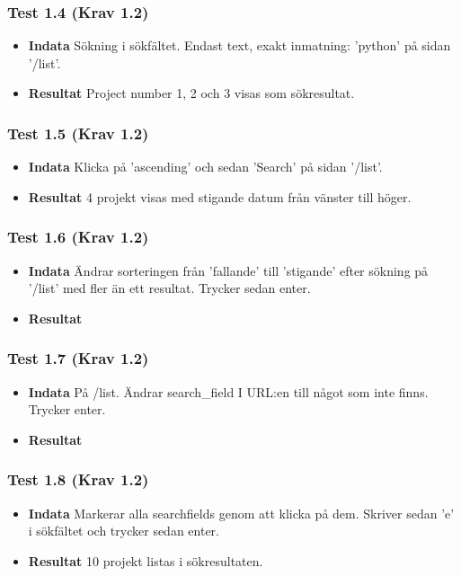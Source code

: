 \documentclass{TDP003mall}
\begin{document}
\subsubsection*{Test 1.4 (Krav 1.2)}
\begin{itemize}
\item[]\textbf{Indata} Sökning i sökfältet. Endast text, exakt inmatning: 'python' på sidan '/list'.
\item[]\textbf{Resultat} Project number 1, 2 och 3 visas som sökresultat.
\end{itemize}
\subsubsection*{Test 1.5 (Krav 1.2)}
\begin{itemize}
\item[]\textbf{Indata} Klicka på 'ascending' och sedan 'Search' på sidan '/list'.
\item[]\textbf{Resultat} 4 projekt visas med stigande datum från vänster till höger.
\end{itemize}
\subsubsection*{Test 1.6 (Krav 1.2)}
\begin{itemize}
\item[]\textbf{Indata} Ändrar sorteringen från 'fallande' till 'stigande' efter sökning på '/list' med fler än ett resultat. Trycker sedan enter.
\item[]\textbf{Resultat} 
\end{itemize}
\subsubsection*{Test 1.7 (Krav 1.2)}
\begin{itemize}
\item[]\textbf{Indata} På /list. Ändrar search\_field I URL:en till något som inte finns. Trycker enter.
\item[]\textbf{Resultat} 
\end{itemize}
\subsubsection*{Test 1.8 (Krav 1.2)}
\begin{itemize}
\item[]\textbf{Indata} Markerar alla searchfields genom att klicka på dem. Skriver sedan 'e' i sökfältet och trycker sedan enter.
\item[]\textbf{Resultat} 10 projekt listas i sökresultaten.
\end{itemize}
\end{document}
